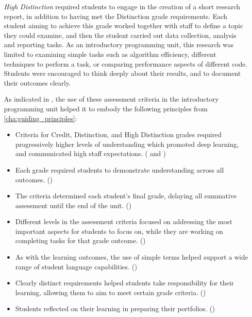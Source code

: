 \emph{High Distinction} required students to engage in the creation of a short research report, in addition to having met the Distinction grade requirements. Each student aiming to achieve this grade worked together with staff to define a topic they could examine, and then the student carried out data collection, analysis and reporting tasks. As an introductory programming unit, this research was limited to examining simple tasks such as algorithm efficiency, different techniques to perform a task, or comparing performance aspects of different code. Students were encouraged to think deeply about their results, and to document their outcomes clearly.

As indicated in , the use of these assessment criteria in the introductory programming unit helped it to embody the following principles from \cref{cha:guiding_principles}:

\begin{itemize}[noitemsep,nolistsep]
	\item Criteria for Credit, Distinction, and High Distinction grades required progressively higher levels of understanding which promoted deep learning, and communicated high staff expectations. ( and )
	\item Each grade required students to demonstrate understanding across all outcomes. ()
	\item The criteria determined each student's final grade, delaying all summative assessment until the end of the unit. ()
	\item Different levels in the assessment criteria focused on addressing the most important aspects for students to focus on, while they are working on completing tasks for that grade outcome. ()
	\item As with the learning outcomes, the use of simple terms helped support a wide range of student language capabilities. ()
	\item Clearly distinct requirements helped students take responsibility for their learning, allowing them to aim to meet certain grade criteria. ()
	\item Students reflected on their learning in preparing their portfolios. ()
\end{itemize}

